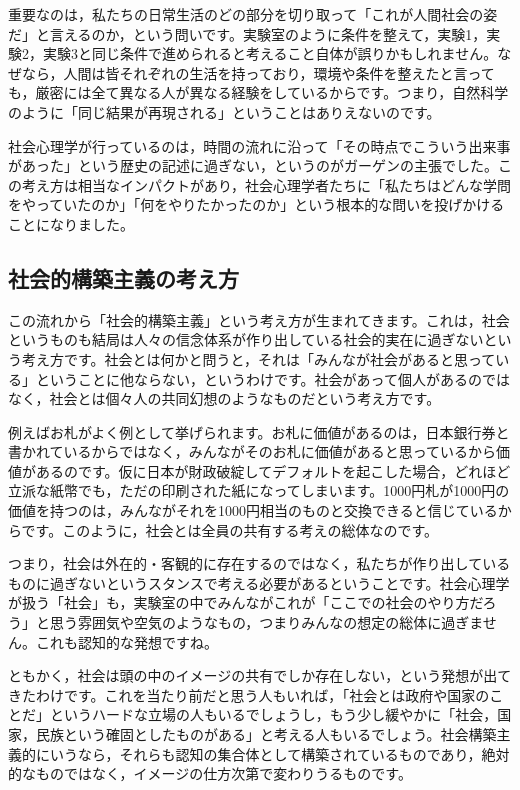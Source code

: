 \documentclass{ltjsbook}
\begin{document}
重要なのは，私たちの日常生活のどの部分を切り取って「これが人間社会の姿だ」と言えるのか，という問いです。実験室のように条件を整えて，実験1，実験2，実験3と同じ条件で進められると考えること自体が誤りかもしれません。なぜなら，人間は皆それぞれの生活を持っており，環境や条件を整えたと言っても，厳密には全て異なる人が異なる経験をしているからです。つまり，自然科学のように「同じ結果が再現される」ということはありえないのです。

社会心理学が行っているのは，時間の流れに沿って「その時点でこういう出来事があった」という歴史の記述に過ぎない，というのがガーゲンの主張でした。この考え方は相当なインパクトがあり，社会心理学者たちに「私たちはどんな学問をやっていたのか」「何をやりたかったのか」という根本的な問いを投げかけることになりました。

\subsection{社会的構築主義の考え方}
この流れから「社会的構築主義」という考え方が生まれてきます。これは，社会というものも結局は人々の信念体系が作り出している社会的実在に過ぎないという考え方です。社会とは何かと問うと，それは「みんなが社会があると思っている」ということに他ならない，というわけです。社会があって個人があるのではなく，社会とは個々人の共同幻想のようなものだという考え方です。

例えばお札がよく例として挙げられます。お札に価値があるのは，日本銀行券と書かれているからではなく，みんながそのお札に価値があると思っているから価値があるのです。仮に日本が財政破綻してデフォルトを起こした場合，どれほど立派な紙幣でも，ただの印刷された紙になってしまいます。1000円札が1000円の価値を持つのは，みんながそれを1000円相当のものと交換できると信じているからです。このように，社会とは全員の共有する考えの総体なのです。

つまり，社会は外在的・客観的に存在するのではなく，私たちが作り出しているものに過ぎないというスタンスで考える必要があるということです。社会心理学が扱う「社会」も，実験室の中でみんながこれが「ここでの社会のやり方だろう」と思う雰囲気や空気のようなもの，つまりみんなの想定の総体に過ぎません。これも認知的な発想ですね。

ともかく，社会は頭の中のイメージの共有でしか存在しない，という発想が出てきたわけです。これを当たり前だと思う人もいれば，「社会とは政府や国家のことだ」というハードな立場の人もいるでしょうし，もう少し緩やかに「社会，国家，民族という確固としたものがある」と考える人もいるでしょう。社会構築主義的にいうなら，それらも認知の集合体として構築されているものであり，絶対的なものではなく，イメージの仕方次第で変わりうるものです。
\end{document}
